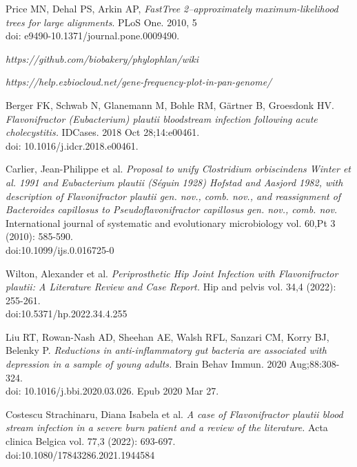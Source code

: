 \documentclass[a4paper,titlepage, oneside]{book}
\begin{document}
\begin{thebibliography}{}
Price MN, Dehal PS, Arkin AP, \emph{FastTree 2–approximately maximum-likelihood trees for large alignments}. PLoS One. 2010, 5\\doi: e9490-10.1371/journal.pone.0009490.


\emph{https://github.com/biobakery/phylophlan/wiki}


\emph{https://help.ezbiocloud.net/gene-frequency-plot-in-pan-genome/}

Berger FK, Schwab N, Glanemann M, Bohle RM, Gärtner B, Groesdonk HV. \emph{Flavonifractor (Eubacterium) plautii bloodstream infection following acute cholecystitis.} IDCases. 2018 Oct 28;14:e00461. \\doi: 10.1016/j.idcr.2018.e00461.

Carlier, Jean-Philippe et al. \emph{Proposal to unify Clostridium orbiscindens Winter et al. 1991 and Eubacterium plautii (Séguin 1928) Hofstad and Aasjord 1982, with description of Flavonifractor plautii gen. nov., comb. nov., and reassignment of Bacteroides capillosus to Pseudoflavonifractor capillosus gen. nov., comb. nov.} International journal of systematic and evolutionary microbiology vol. 60,Pt 3 (2010): 585-590.\\doi:10.1099/ijs.0.016725-0

Wilton, Alexander et al. \emph{Periprosthetic Hip Joint Infection with Flavonifractor plautii: A Literature Review and Case Report.} Hip and pelvis vol. 34,4 (2022): 255-261.\\doi:10.5371/hp.2022.34.4.255

Liu RT, Rowan-Nash AD, Sheehan AE, Walsh RFL, Sanzari CM, Korry BJ, Belenky P. \emph{Reductions in anti-inflammatory gut bacteria are associated with depression in a sample of young adults.} Brain Behav Immun. 2020 Aug;88:308-324.\\doi: 10.1016/j.bbi.2020.03.026. Epub 2020 Mar 27. 

Costescu Strachinaru, Diana Isabela et al. \emph{A case of Flavonifractor plautii blood stream infection in a severe burn patient and a review of the literature.} Acta clinica Belgica vol. 77,3 (2022): 693-697.\\doi:10.1080/17843286.2021.1944584

\end{thebibliography}
\end{document}
